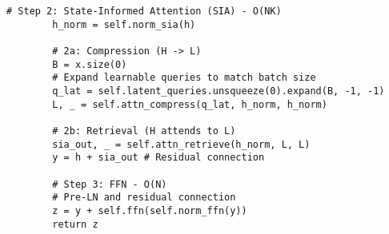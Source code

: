 \documentclass[10pt,twocolumn,letterpaper]{article}
\begin{document}
\begin{lstlisting}[style=pytorchstyle, caption={PyTorch-style pseudocode for the LST Block.}, label=lst:code_block]
        # Step 2: State-Informed Attention (SIA) - O(NK)
        h_norm = self.norm_sia(h)

        # 2a: Compression (H -> L)
        B = x.size(0)
        # Expand learnable queries to match batch size
        q_lat = self.latent_queries.unsqueeze(0).expand(B, -1, -1)
        L, _ = self.attn_compress(q_lat, h_norm, h_norm)

        # 2b: Retrieval (H attends to L)
        sia_out, _ = self.attn_retrieve(h_norm, L, L)
        y = h + sia_out # Residual connection

        # Step 3: FFN - O(N)
        # Pre-LN and residual connection
        z = y + self.ffn(self.norm_ffn(y))
        return z
\end{lstlisting}
\end{document}
